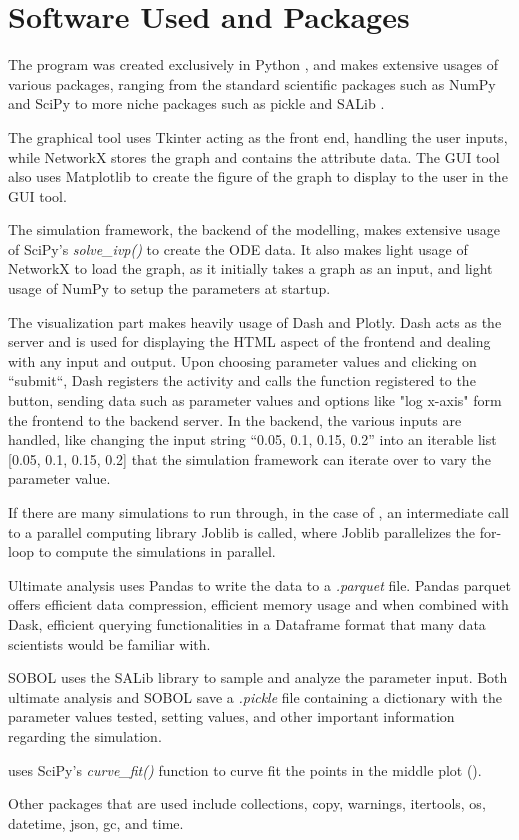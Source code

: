 \section{Software Used and Packages}
The program was created exclusively in Python \cite{Python}, and makes extensive usages of various packages, ranging from the standard scientific packages such as NumPy \cite{NumPy} and SciPy to more niche packages such as pickle and SALib \cite{iwanagaSALib20Advancing2022, hermanSALibOpensourcePython2017}.

The graphical tool uses Tkinter acting as the front end, handling the user inputs, while NetworkX \cite{hagbergExploringNetworkStructure2008} stores the graph and contains the attribute data. 
The GUI tool also uses Matplotlib \cite{Matplotlib}to create the figure of the graph to display to the user in the GUI tool.

The simulation framework, the backend of the modelling, makes extensive usage of SciPy's \textit{solve\_ivp()} to create the ODE data. 
It also makes light usage of NetworkX to load the graph, as it initially takes a graph as an input, and light usage of NumPy to setup the parameters at startup. 

The visualization part makes heavily usage of Dash and Plotly. 
Dash acts as the server and is used for displaying the HTML aspect of the frontend and dealing with any input and output. 
Upon choosing parameter values and clicking on “submit“, Dash registers the activity and calls the function registered to the button, sending data such as parameter values and options like "log x-axis" form the frontend to the backend server. 
In the backend, the various inputs are handled, like changing the input string “0.05, 0.1, 0.15, 0.2” into an iterable list [0.05, 0.1, 0.15, 0.2] that the simulation framework can iterate over to vary the parameter value. 

If there are many simulations to run through, in the case of , an intermediate call to a parallel computing library Joblib is called, where Joblib parallelizes the for-loop to compute the simulations in parallel. 

Ultimate analysis uses Pandas to write the data to a \textit{.parquet} file. 
Pandas parquet offers efficient data compression, efficient memory usage and when combined with Dask, efficient querying functionalities in a Dataframe format that many data scientists would be familiar with. 

SOBOL uses the SALib library to sample and analyze the parameter input. 
Both ultimate analysis and SOBOL save a \textit{.pickle} file containing a dictionary with the parameter values tested, setting values, and other important information regarding the simulation. 

 uses SciPy's \textit{curve\_fit()} function to curve fit the points in the middle plot (). 

Other packages that are used include collections, copy, warnings, itertools, os, datetime, json, gc, and time. 